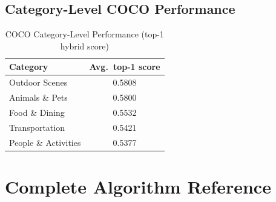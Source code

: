 \documentclass[12pt,a4paper]{article}
\theoremstyle{definition}
\theoremstyle{plain}
\theoremstyle{remark}
\begin{document}
\subsection{Category-Level COCO Performance}

\begin{table}[H]
\centering
\caption{COCO Category-Level Performance (top-1 hybrid score)}
\begin{tabular}{lc}
\toprule
Category & Avg.\ top-1 score \\
\midrule
Outdoor Scenes & 0.5808 \\
Animals \& Pets & 0.5800 \\
Food \& Dining & 0.5532 \\
Transportation & 0.5421 \\
People \& Activities & 0.5377 \\
\bottomrule
\end{tabular}
\end{table}

\newpage
\section{Complete Algorithm Reference}
\end{document}
